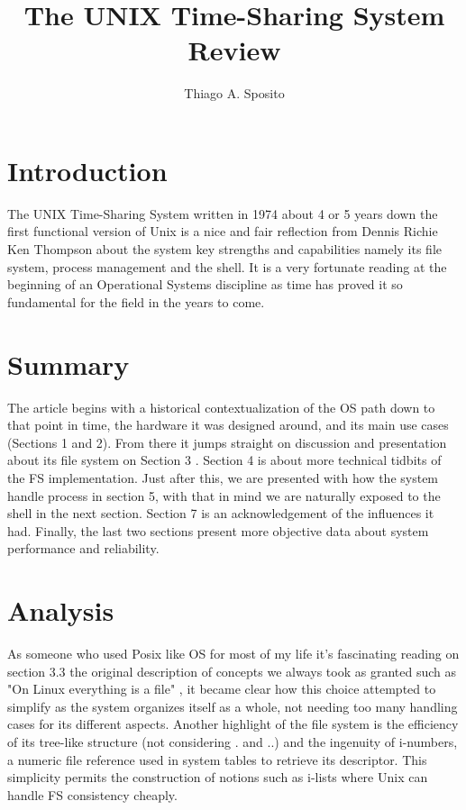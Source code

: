 \documentclass[12pt]{article}
\title{The UNIX Time-Sharing System Review}
\author{Thiago A. Sposito\inst{1} }
\begin{document}
 

\maketitle


\section{Introduction}

The UNIX Time-Sharing System written in 1974 about 4 or 5 years down the first functional version of Unix \cite{ritchie1978unix} is a nice and fair reflection from Dennis Richie Ken Thompson about the system key strengths and capabilities namely its file system, process management and the shell. It is a very fortunate reading at the beginning of an Operational Systems discipline as time has proved it so fundamental for the field in the years to come\cite{richie_benet_1999}.

\section{Summary} 

The article begins with a historical contextualization of the OS path down to that point in time, the hardware it was designed around, and its main use cases (Sections 1 and 2). From there it jumps straight on discussion and presentation about its file system on Section 3 . Section 4 is about more technical tidbits of the FS implementation. Just after this, we are presented with how the system handle process in section 5, with that in mind we are naturally exposed to the shell in the next section. Section 7 is an acknowledgement of the influences it had. Finally, the last two sections present more objective data about system performance and reliability. 


\section{Analysis}

As someone who used Posix like OS for most of my life it's fascinating reading on section 3.3 the original description of concepts we always took as granted such as "On Linux everything is a file" \cite{torvalds_2007}, it became clear how this choice attempted to simplify as the system organizes itself as a whole, not needing too many handling cases for its different aspects. Another highlight of the file system is the efficiency of its tree-like structure (not considering  . and ..) and the ingenuity of i-numbers, a  numeric file reference used in system tables to retrieve its descriptor. This simplicity permits the construction of notions such as i-lists where Unix can handle FS consistency cheaply. 
\end{document}
